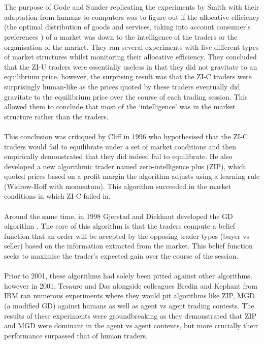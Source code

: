 \documentclass[ %
                    author={Ashwinder Khurana},
                supervisor={Prof Dave Cliff},
                    degree={MEng},
                     title={The Deeply Reinforced Trader},
                  subtitle={},
                      type={enterprise},
                      year={2020} ]{dissertation}
\begin{document}
\\
\\
The purpose of Gode and Sunder replicating the experiments by Smith with their adaptation from humans to computers was to figure out if the allocative efficiency (the optimal distribution of goods and services, taking into account consumer's preferences \cite{https://www.economicshelp.org/blog/glossary/allocative-efficiency/}) of a market was down to the intelligence of the traders or the organisation of the market. They ran several experiments with five different types of market structures whilst monitoring their allocative efficiency. They concluded that the ZI-U traders were essentially useless in that they did not gravitate to an equilibrium price, however, the surprising result was that the ZI-C traders were surprisingly human-like as the prices quoted by these traders eventually did gravitate to the equilibrium price over the course of each trading session. This allowed them to conclude that most of the \enquote*{intelligence} was in the market structure rather than the traders. 
\\
\\
This conclusion was critiqued by Cliff in 1996 \cite{Cliff-critique} who hypothesised that the ZI-C traders would fail to equilibrate under a set of market conditions and then empirically demonstrated that they did indeed fail to equilibrate. He also developed a new algorithmic trader named zero-intelligence plus (ZIP), which quoted prices based on a profit margin the algorithm adjusts using a learning rule (Widrow-Hoff with momentum). This algorithm succeeded in the market conditions in which ZI-C failed in. 
\\
\\
Around the same time, in 1998 Gjerstad and Dickhaut developed the GD algorithm \cite{GD}. The core of this algorithm is that the traders compute a belief function that an order will be accepted by the opposing trader types (buyer vs seller) based on the information extracted from the market. This belief function seeks to maximise the trader's expected gain over the course of the session.
\\
\\
Prior to 2001, these algorithms had solely been pitted against other algorithms, however in 2001, Tesauro and Das alongside colleagues Bredin and Kephant from IBM \cite{IBM experiments} ran numerous experiments where they would pit algorithms like ZIP, MGD (a modified GD) against humans as well as agent vs agent trading contests. The results of these experiments were groundbreaking as they demonstrated that ZIP and MGD were dominant in the agent vs agent contents, but more crucially their performance surpassed that of human traders. 
\end{document}
